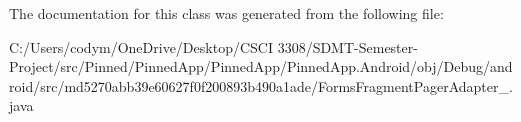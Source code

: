 The documentation for this class was generated from the following file\+:\begin{DoxyCompactItemize}
\item 
C\+:/\+Users/codym/\+One\+Drive/\+Desktop/\+C\+S\+C\+I 3308/\+S\+D\+M\+T-\/\+Semester-\/\+Project/src/\+Pinned/\+Pinned\+App/\+Pinned\+App/\+Pinned\+App.\+Android/obj/\+Debug/android/src/md5270abb39e60627f0f200893b490a1ade/Forms\+Fragment\+Pager\+Adapter\+\_.\+java\end{DoxyCompactItemize}

